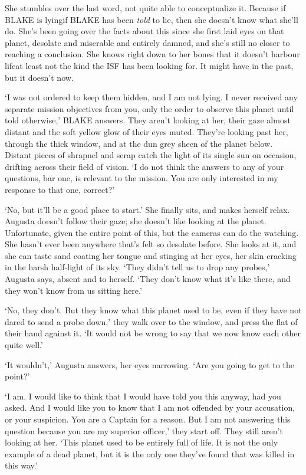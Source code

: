 She stumbles over the last word, not quite able to conceptualize
it. Because if BLAKE is lying\textemdash if BLAKE has
been \emph{told} to lie, then she doesn't know what she'll do. She's
been going over the facts about this since she first laid eyes on that
planet, desolate and miserable and entirely damned, and she's still no
closer to reaching a conclusion. She knows right down to her bones
that it doesn't harbour life\textemdash at least not the kind the
ISF has been looking for. It might have in the past, but it doesn't
now.

`I was not ordered to keep them hidden, and I am not lying. I never
received any separate mission objectives from you, only the order to
observe this planet until told otherwise,' BLAKE answers. They aren't
looking at her, their gaze almost distant and the soft yellow glow of
their eyes muted. They're looking past her, through the thick window,
and at the dun grey sheen of the planet below. Distant pieces of
shrapnel and scrap catch the light of its single sun on occasion,
drifting across their field of vision. `I do not think the answers to
any of your questions, bar one, is relevant to the mission. You are
only interested in my response to that one, correct?'

`No, but it'll be a good place to start.' She finally sits, and makes
herself relax. Augusta doesn't follow their gaze; she doesn't like
looking at the planet. Unfortunate, given the entire point of this,
but the cameras can do the watching. She hasn't ever been anywhere
that's felt so desolate before. She looks at it, and she can taste
sand coating her tongue and stinging at her eyes, her skin cracking in
the harsh half-light of its sky. `They didn't tell us to drop any
probes,' Augusta says, absent and to herself. `They don't know what
it's like there, and they won't know from us sitting here.'

`No, they don't. But they know what this planet used to be, even if
they have not dared to send a probe down,' they walk over to the
window, and press the flat of their hand against it. `It would not be
wrong to say that we now know each other quite well.'

`It wouldn't,' Augusta answers, her eyes narrowing. `Are you going to
get to the point?'

`I am. I would like to think that I would have told you this anyway,
had you asked. And I would like you to know that I am not offended by
your accusation, or your suspicion. You are a Captain for a
reason. But I am not answering this question because you are my
superior officer,' they start off. They still aren't looking at
her. `This planet used to be entirely full of life. It is not the only
example of a dead planet, but it is the only one they've found that
was killed in this way.'

